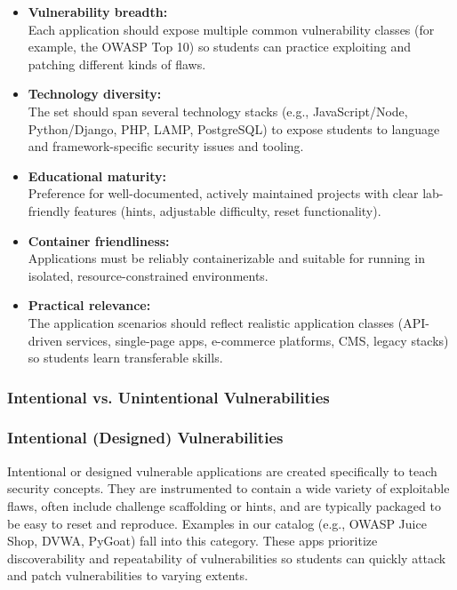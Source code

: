 \documentclass[12pt]{article}
\begin{document}
\begin{itemize}
    \item \textbf{Vulnerability breadth:}\\ Each application should expose multiple common vulnerability classes (for example, the OWASP Top 10) so students can practice exploiting and patching different kinds of flaws.
    \item \textbf{Technology diversity:}\\ The set should span several technology stacks (e.g., JavaScript/Node, Python/Django, PHP, LAMP, PostgreSQL) to expose students to language and framework-specific security issues and tooling.
    \item \textbf{Educational maturity:}\\ Preference for well-documented, actively maintained projects with clear lab-friendly features (hints, adjustable difficulty, reset functionality).
    \item \textbf{Container friendliness:}\\ Applications must be reliably containerizable and suitable for running in isolated, resource-constrained environments.
    \item \textbf{Practical relevance:}\\ The application scenarios should reflect realistic application classes (API-driven services, single-page apps, e-commerce platforms, CMS, legacy stacks) so students learn transferable skills.
\end{itemize}

\subsubsection{Intentional vs. Unintentional Vulnerabilities}

\subsubsection*{Intentional (Designed) Vulnerabilities}
Intentional or designed vulnerable applications are created specifically to teach security concepts. They are instrumented to contain a wide variety of exploitable flaws, often include challenge scaffolding or hints, and are typically packaged to be easy to reset and reproduce. Examples in our catalog (e.g., OWASP Juice Shop, DVWA, PyGoat) fall into this category. These apps prioritize discoverability and repeatability of vulnerabilities so students can quickly attack and patch vulnerabilities to varying extents.
\end{document}
